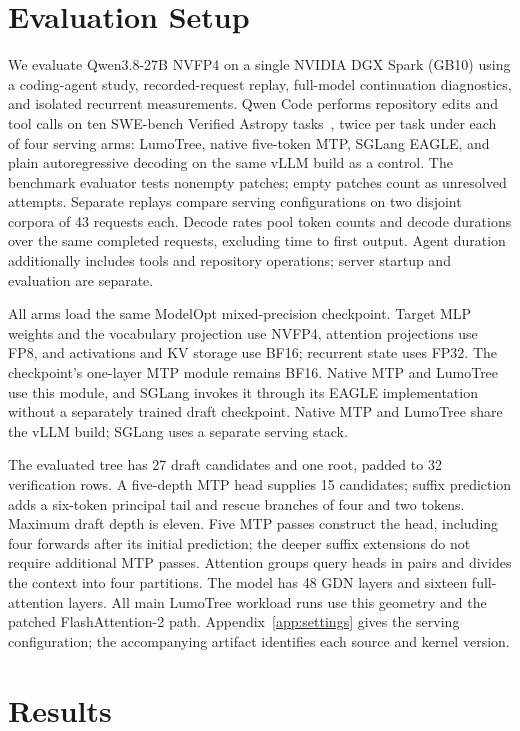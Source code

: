 \documentclass[conference]{IEEEtran}
\newcommand{\sys}{LumoTree}
\begin{document}
\section{Evaluation Setup}
\label{sec:protocol}
We evaluate Qwen3.8-27B NVFP4 on a single NVIDIA DGX Spark (GB10) using a coding-agent study, recorded-request replay, full-model continuation diagnostics, and isolated recurrent measurements. Qwen Code performs repository edits and tool calls on ten SWE-bench Verified Astropy tasks~\cite{jimenez2024swe}, twice per task under each of four serving arms: \sys{}, native five-token MTP, SGLang EAGLE, and plain autoregressive decoding on the same vLLM build as a control. The benchmark evaluator tests nonempty patches; empty patches count as unresolved attempts. Separate replays compare serving configurations on two disjoint corpora of 43 requests each. Decode rates pool token counts and decode durations over the same completed requests, excluding time to first output. Agent duration additionally includes tools and repository operations; server startup and evaluation are separate.

All arms load the same ModelOpt mixed-precision checkpoint. Target MLP weights and the vocabulary projection use NVFP4, attention projections use FP8, and activations and KV storage use BF16; recurrent state uses FP32. The checkpoint's one-layer MTP module remains BF16. Native MTP and \sys{} use this module, and SGLang invokes it through its EAGLE implementation without a separately trained draft checkpoint. Native MTP and \sys{} share the vLLM build; SGLang uses a separate serving stack.

The evaluated tree has 27 draft candidates and one root, padded to 32 verification rows. A five-depth MTP head supplies 15 candidates; suffix prediction adds a six-token principal tail and rescue branches of four and two tokens. Maximum draft depth is eleven. Five MTP passes construct the head, including four forwards after its initial prediction; the deeper suffix extensions do not require additional MTP passes. Attention groups query heads in pairs and divides the context into four partitions. The model has 48 GDN layers and sixteen full-attention layers. All main \sys{} workload runs use this geometry and the patched FlashAttention-2 path. Appendix~\ref{app:settings} gives the serving configuration; the accompanying artifact identifies each source and kernel version.



\section{Results}
\label{sec:results}
\end{document}

